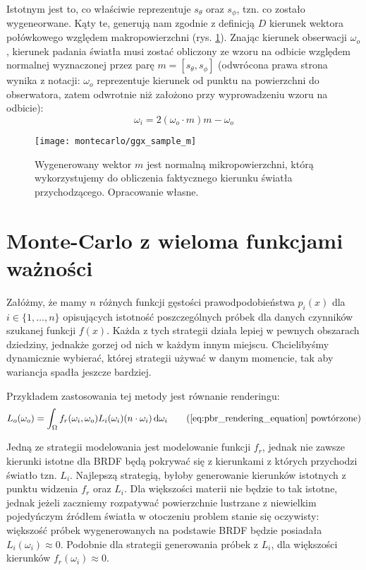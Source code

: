 \documentclass[../main.tex]{subfiles}
\begin{document}
Istotnym jest to, co właściwie reprezentuje $s_\theta$ oraz $s_\phi$, tzn. co zostało wygeneorwane. Kąty te, generują nam zgodnie z definicją $D$ kierunek wektora połówkowego względem makropowierzchni (rys. \ref{fig:GGXSampleMReflect}). Znając kierunek obserwacji $\omega_o$, kierunek padania światła musi zostać obliczony ze wzoru na odbicie względem normalnej wyznaczonej przez parę $m = [s_\theta, s_\phi]$ (odwrócona prawa strona wynika z notacji: $\omega_o$ reprezentuje kierunek od punktu na powierzchni do obserwatora, zatem odwrotnie niż założono przy wyprowadzeniu wzoru na odbicie):
\begin{equation}
	\omega_i = 2(\omega_o \cdot m)m - \omega_o
\end{equation}

\begin{figure}[h]
    \centering
    \texttt{[image: montecarlo/ggx\_sample\_m]}
    \caption{Wygenerowany wektor $m$ jest normalną mikropowierzchni, którą wykorzystujemy do obliczenia faktycznego kierunku światła przychodzącego. Opracowanie własne.}
    \label{fig:GGXSampleMReflect}
\end{figure}

\section{Monte-Carlo z wieloma funkcjami ważności}
\label{Chapter:MIS}

Załóżmy, że mamy $n$ różnych funkcji gęstości prawodpodobieństwa $p_{i}(x)$ dla $i \in \{ 1, \ldots, n \}$ opisujących istotność poszczególnych próbek dla danych czynników szukanej funkcji $f(x)$. Każda z tych strategii działa lepiej w pewnych obszarach dziedziny, jednakże gorzej od nich w każdym innym miejscu. Chcielibyśmy dynamicznie wybierać, której strategii używać w danym momencie, tak aby wariancja spadła jeszcze bardziej.

Przykładem zastosowania tej metody jest równanie renderingu:
\begin{equation*}
L_{o}(\omega_o) =
\int_{\Omega} {
    f_r(\omega_i, \omega_o)
    L_i(\omega_i)
    (n \cdot \omega_i)
    \dd{\omega_i}
}
\tag{\ref{eq:pbr_rendering_equation} powtórzone}
\end{equation*}

Jedną ze strategii modelowania jest modelowanie funkcji $f_r$, jednak nie zawsze kierunki istotne dla BRDF będą pokrywać się z kierunkami z których przychodzi światło tzn. $L_i$. Najlepszą strategią, byłoby generowanie kierunków istotnych z punktu widzenia $f_r$ oraz $L_i$. Dla większości materii nie będzie to tak istotne, jednak jeżeli zaczniemy rozpatywać powierzchnie lustrzane z niewielkim pojedyńczym źródłem światła w otoczeniu problem stanie się oczywisty: większość próbek wygenerowanych na podstawie BRDF będzie posiadała $L_i(\omega_i) \approx 0$. Podobnie dla strategii generowania próbek z $L_i$, dla większości kierunków $f_r(\omega_i) \approx 0$.
\end{document}
